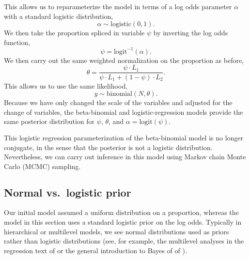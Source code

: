 \documentclass[11pt]{report}
\newcommand{\logit}{\textrm{logit}}
\newcommand{\ilogit}{\logit^{-1}}
\begin{document}
This allows us to reparameterize the model in terms of a log odds
parameter $\alpha$ with a standard logistic distribution,
\[
  \alpha \sim \textrm{logistic}(0, 1).
\]
We then take the proportion spliced in variable $\psi$ by inverting
the log odds function,
\[
  \psi = \ilogit(\alpha).
\]
We then carry out the same weighted normalization on the proportion as
before,
\[
  \theta = \frac{\psi \cdot L_1}{\psi \cdot L_1 + (1 - \psi) \cdot L_2}.
\]
This allows us to use the same likelihood,
\[
  y \sim \textrm{binomial}(N, \theta).
\]
Because we have only changed the scale of the variables and adjusted
for the change of variables, the beta-binomial and logistic-regression
models provide the same posterior distribution for $\psi$, $\theta$,
and $\alpha = \logit(\psi)$.

This logistic regression parameterization of the beta-binomial model
is no longer conjugate, in the sense that the posterior is not a
logistic distribution.  Nevertheless, we can carry out inference in
this model using Markov chain Monte Carlo (MCMC) sampling.

\subsection{Normal vs.\ logistic prior}

Our initial model assumed a uniform distribution on a proportion,
whereas the model in this section uses a standard logistic prior on
the log odds.  Typically in hierarchical or multilevel models, we see
normal distributions used as priors rather than logistic
distributions (see, for example, the multilevel analyses in the
regression text of \cite{gelman2006data} or the general introduction
to Bayes of of \cite{lunn2013bugs}).
\end{document}
